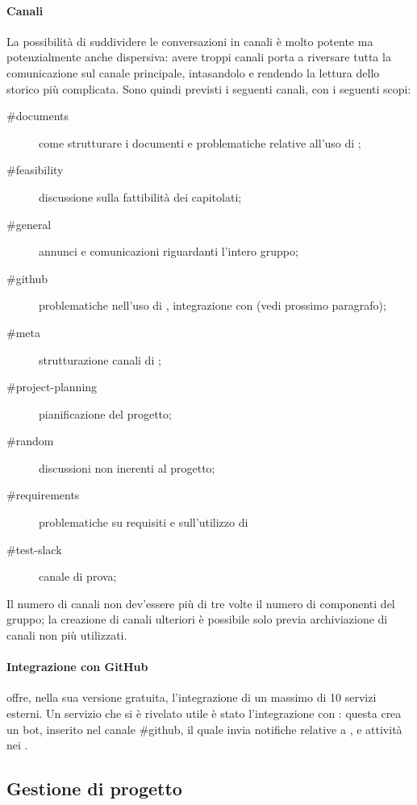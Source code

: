 \paragraph{Canali} La possibilità di suddividere le conversazioni in canali è molto potente ma potenzialmente anche dispersiva: avere troppi canali porta a riversare tutta la comunicazione sul canale principale, intasandolo e rendendo la lettura dello storico più complicata. Sono quindi previsti i seguenti canali, con i seguenti scopi:
\begin{description}
	\item[\#documents] come strutturare i documenti e problematiche relative all'uso di ;
	\item[\#feasibility] discussione sulla fattibilità dei capitolati;
	\item[\#general] annunci e comunicazioni riguardanti l'intero gruppo;
	\item[\#github] problematiche nell'uso di , integrazione con  (vedi prossimo paragrafo);
	\item[\#meta] strutturazione canali di ;
	\item[\#project-planning] pianificazione del progetto;
	\item[\#random] discussioni non inerenti al progetto;
	\item[\#requirements] problematiche su requisiti e sull'utilizzo di 
	\item[\#test-slack] canale di prova;
\end{description}
Il numero di canali non dev'essere più di tre volte il numero di componenti del gruppo; la creazione di canali ulteriori è possibile solo previa archiviazione di canali non più utilizzati.
\paragraph{Integrazione con GitHub}  offre, nella sua versione gratuita, l'integrazione di un massimo di 10 servizi esterni. Un servizio che si è rivelato utile è stato l'integrazione con : questa crea un bot, inserito nel canale \#github, il quale invia notifiche relative a ,  e attività nei .



\subsection{Gestione di progetto}

